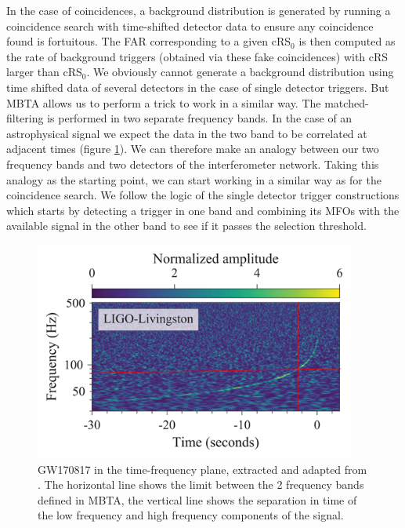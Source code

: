In the case of coincidences, a background distribution is generated by running a coincidence search with time-shifted detector data to ensure any coincidence found is fortuitous.
The FAR corresponding to a given cRS$_0$ is then computed as the rate of background triggers (obtained via these fake coincidences) with cRS larger than cRS$_0$.
We obviously cannot generate a background distribution using time shifted data of several detectors in the case of single detector triggers.
But MBTA allows us to perform a trick to work in a similar way.
The matched-filtering is performed in two separate frequency bands.
In the case of an astrophysical signal we expect the data in the two band to be correlated at adjacent times (figure \ref{fig:chirp}).
We can therefore make an analogy between our two frequency bands and two detectors of the interferometer network.
Taking this analogy as the starting point, we can start working in a similar way as for the coincidence search.
We follow the logic of the single detector trigger constructions which starts by detecting a trigger in one band and combining its MFOs with the available signal in the other band to see if it passes the selection threshold.
%
\begin{figure}[ht]
    \centering
    \includegraphics[width=300pt]{sectionFAR/GW170817_chirp.png}
    \caption{GW170817 in the time-frequency plane, extracted and adapted from \cite{gw170817}. The horizontal line shows the limit between the 2 frequency bands defined in MBTA, the vertical line shows the separation in time of the low frequency and high frequency components of the signal. }
    \label{fig:chirp}
\end{figure}
%

